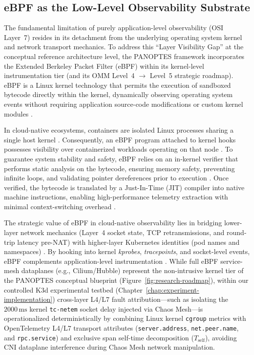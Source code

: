 \subsection{eBPF as the Low-Level Observability Substrate}
\label{subsec:ebpf-foundation}

The fundamental limitation of purely application-level observability (OSI Layer~7) resides in its detachment from the underlying operating system kernel and network transport mechanics. To address this ``Layer Visibility Gap'' at the conceptual reference architecture level, the PANOPTES framework incorporates the Extended Berkeley Packet Filter (eBPF) within its kernel-level instrumentation tier (and its OMM Level~4 $\rightarrow$ Level~5 strategic roadmap). eBPF is a Linux kernel technology that permits the execution of sandboxed bytecode directly within the kernel, dynamically observing operating system events without requiring application source-code modifications or custom kernel modules \cite{rice_2023}.

In cloud-native ecosystems, containers are isolated Linux processes sharing a single host kernel \cite{salazar2022security}. Consequently, an eBPF program attached to kernel hooks possesses visibility over containerized workloads operating on that node \cite{rice_2023, salazar2022security}. To guarantee system stability and safety, eBPF relies on an in-kernel verifier that performs static analysis on the bytecode, ensuring memory safety, preventing infinite loops, and validating pointer dereferences prior to execution \cite{calavera2019linux}. Once verified, the bytecode is translated by a Just-In-Time (JIT) compiler into native machine instructions, enabling high-performance telemetry extraction with minimal context-switching overhead \cite{rice_2023, calavera2019linux}.

The strategic value of eBPF in cloud-native observability lies in bridging lower-layer network mechanics (Layer~4 socket state, TCP retransmissions, and round-trip latency pre-NAT) with higher-layer Kubernetes identities (pod names and namespaces) \cite{salazar2022security, shekhar2023ultimate}. By hooking into kernel \textit{kprobes}, \textit{tracepoints}, and socket-level events, eBPF complements application-level instrumentation \cite{calavera2019linux}. While full eBPF service-mesh dataplanes (e.g., Cilium/Hubble) represent the non-intrusive kernel tier of the PANOPTES conceptual blueprint (Figure~\ref{fig:research-roadmap}), within our controlled K3d experimental testbed (Chapter~\ref{chap:experiment-implementation}) cross-layer L4/L7 fault attribution---such as isolating the $2000\,\text{ms}$ kernel \texttt{tc-netem} socket delay injected via Chaos Mesh---is operationalized deterministically by combining Linux kernel \texttt{cgroup} metrics with OpenTelemetry L4/L7 transport attributes (\texttt{server.address}, \texttt{net.peer.name}, and \texttt{rpc.service}) and exclusive span self-time decomposition ($T_{\text{self}}$), avoiding CNI dataplane interference during Chaos Mesh network manipulation.
